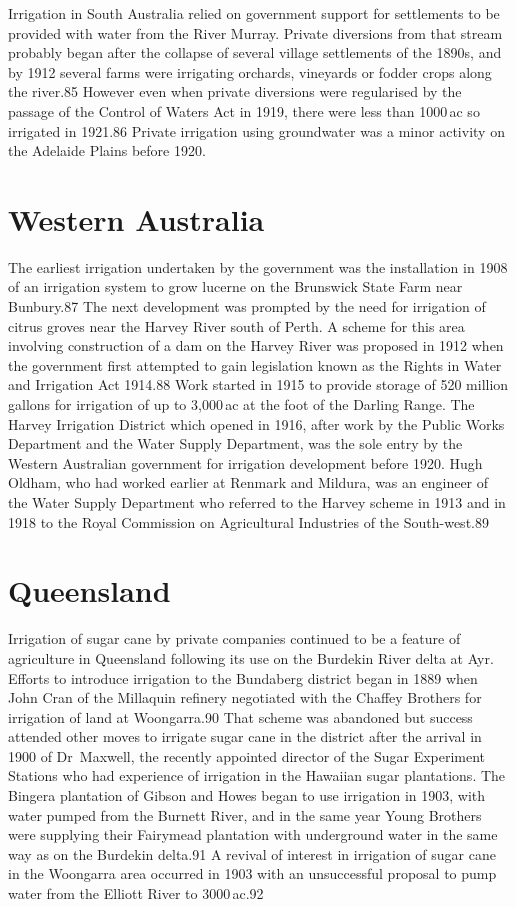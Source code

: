 Irrigation in South Australia relied on government support for
settlements to be provided with water from the River Murray.  Private
diversions from that stream probably began after the collapse of
several village settlements of the 1890s, and by 1912 several farms
were irrigating orchards, vineyards or fodder crops along the river.85
However even when private diversions were regularised by the passage
of the Control of Waters Act in 1919, there were less than 1000\,ac so
irrigated in 1921.86 Private irrigation using groundwater was a minor
activity on the Adelaide Plains before 1920.

\section{Western Australia}

The earliest irrigation undertaken by the government was the
installation in 1908 of an irrigation system to grow lucerne on the
Brunswick State Farm near Bunbury.87 The next development was prompted
by the need for irrigation of citrus groves near the Harvey River
south of Perth. A scheme for this area involving construction of a dam
on the Harvey River was proposed in 1912 when the government first
attempted to gain legislation known as the Rights in Water and
Irrigation Act 1914.88 Work started in 1915 to provide storage of 520
million gallons for irrigation of up to 3,000\,ac at the foot of the
Darling Range.  The Harvey Irrigation District which opened in 1916,
after work by the Public Works Department and the Water Supply
Department, was the sole entry by the Western Australian government
for irrigation development before 1920.  Hugh Oldham, who had worked
earlier at Renmark and Mildura, was an engineer of the Water Supply
Department who referred to the Harvey scheme in 1913 and in 1918 to
the Royal Commission on Agricultural Industries of the South-west.89

\section{Queensland}

Irrigation of sugar cane by private companies continued to be a
feature of agriculture in Queensland following its use on the Burdekin
River delta at Ayr.  Efforts to introduce irrigation to the Bundaberg
district began in 1889 when John Cran of the Millaquin refinery
negotiated with the Chaffey Brothers for irrigation of land at
Woongarra.90 That scheme was abandoned but success attended other
moves to irrigate sugar cane in the district after the arrival in 1900
of Dr~Maxwell, the recently appointed director of the Sugar Experiment
Stations who had experience of irrigation in the Hawaiian sugar
plantations.  The Bingera plantation of Gibson and Howes began to use
irrigation in 1903, with water pumped from the Burnett River, and in
the same year Young Brothers were supplying their Fairymead plantation
with underground water in the same way as on the Burdekin delta.91 A
revival of interest in irrigation of sugar cane in the Woongarra area
occurred in 1903 with an unsuccessful proposal to pump water from the
Elliott River to 3000\,ac.92

